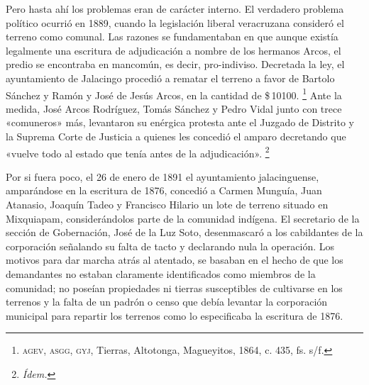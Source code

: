 \documentclass[14pt,twoside,final]{extbook} %
\let\oldfootnote\footnote
\renewcommand\footnote[1]{%
\oldfootnote{\hspace{1mm}#1}}
\begin{document}
Pero hasta ahí los problemas eran de carácter interno. El verdadero problema político ocurrió en 1889, cuando la legislación liberal veracruzana consideró el terreno como comunal. Las razones se fundamentaban en que aunque existía legalmente una escritura de adjudicación a nombre de los hermanos Arcos, el predio se encontraba en mancomún, es decir, pro-indiviso. Decretada la ley, el ayuntamiento de Jalacingo procedió a rematar el terreno a favor de Bartolo Sánchez y Ramón y José de Jesús Arcos, en la cantidad de \$\,10100.\footnote{\textsc{agev, asgg, gyj}, Tierras, Altotonga, Magueyitos, 1864, c. 435, fs. s/f.} Ante la medida, José Arcos Rodríguez, Tomás Sánchez y Pedro Vidal junto con trece «comuneros» más, levantaron su enérgica protesta ante el Juzgado de Distrito y la Suprema Corte de Justicia a quienes les concedió el amparo decretando que «vuelve todo al estado que tenía antes de la adjudicación».\footnote{\em Ídem.}

Por si fuera poco, el 26 de enero de 1891 el ayuntamiento jalacinguense, amparándose en la escritura de 1876, concedió a Carmen Munguía, Juan Atanasio, Joaquín Tadeo y Francisco Hilario un lote de terreno situado en Mixquiapam, considerándolos parte de la comunidad indígena. El secretario de la sección de Gobernación, José de la Luz Soto, desenmascaró a los cabildantes de la corporación señalando su falta de tacto y declarando nula la operación. Los motivos para dar marcha atrás al atentado, se basaban en el hecho de que los demandantes no estaban claramente identificados como miembros de la comunidad; no poseían propiedades ni tierras susceptibles de cultivarse en los terrenos y la falta de un padrón o censo que debía levantar la corporación municipal para repartir los terrenos como lo especificaba la escritura de 1876.
\end{document}
